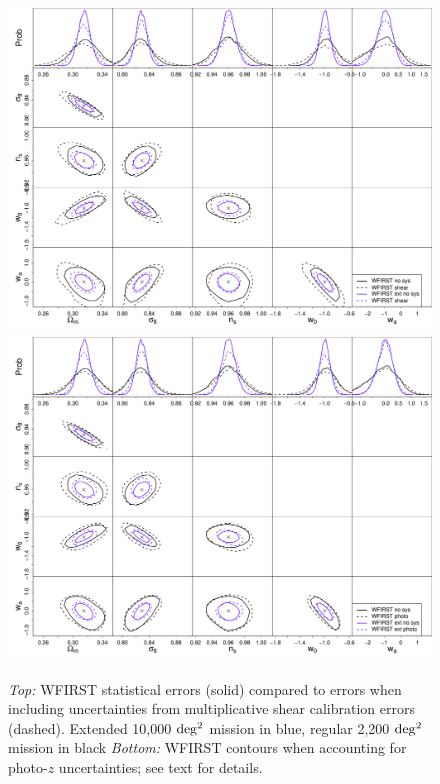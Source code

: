 \begin{figure}
\includegraphics[width=14cm]{Plots/forecasts/WFIRST_shear.pdf}
\includegraphics[width=14cm]{Plots/forecasts/WFIRST_photo.pdf}
\caption{\textit{Top:} WFIRST statistical errors (solid) compared to errors when including uncertainties from multiplicative shear calibration errors (dashed).  Extended 10,000 $\mathrm{deg^2}$ mission in blue, regular 2,200 $\mathrm{deg^2}$ mission in black
\textit{Bottom:} WFIRST contours when accounting for photo-$z$ uncertainties; see text for details.}
         \label{fi:sys_obs}
\end{figure}

